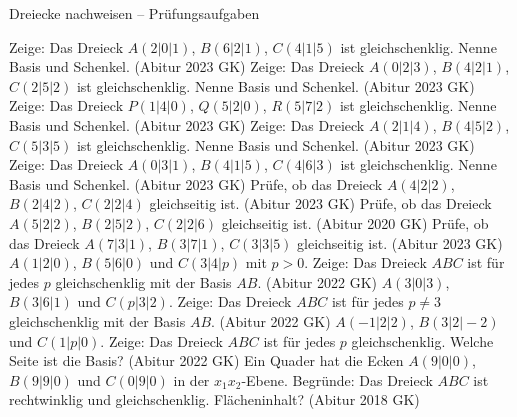 \begin{aufgabe}{Dreiecke nachweisen – Prüfungsaufgaben}
\begin{teile}
\teil Zeige: Das Dreieck $A(2 | 0 | 1)$, $B(6 | 2 | 1)$, $C(4 | 1 | 5)$ ist gleichschenklig. Nenne Basis und Schenkel. \hfill (Abitur 2023 GK)
\teil Zeige: Das Dreieck $A(0 | 2 | 3)$, $B(4 | 2 | 1)$, $C(2 | 5 | 2)$ ist gleichschenklig. Nenne Basis und Schenkel. \hfill (Abitur 2023 GK)
\teil Zeige: Das Dreieck $P(1 | 4 | 0)$, $Q(5 | 2 | 0)$, $R(5 | 7 | 2)$ ist gleichschenklig. Nenne Basis und Schenkel. \hfill (Abitur 2023 GK)
\teil Zeige: Das Dreieck $A(2 | 1 | 4)$, $B(4 | 5 | 2)$, $C(5 | 3 | 5)$ ist gleichschenklig. Nenne Basis und Schenkel. \hfill (Abitur 2023 GK)
\teil Zeige: Das Dreieck $A(0 | 3 | 1)$, $B(4 | 1 | 5)$, $C(4 | 6 | 3)$ ist gleichschenklig. Nenne Basis und Schenkel. \hfill (Abitur 2023 GK)
\teil Prüfe, ob das Dreieck $A(4 | 2 | 2)$, $B(2 | 4 | 2)$, $C(2 | 2 | 4)$ gleichseitig ist. \hfill (Abitur 2023 GK)
\teil Prüfe, ob das Dreieck $A(5 | 2 | 2)$, $B(2 | 5 | 2)$, $C(2 | 2 | 6)$ gleichseitig ist. \hfill (Abitur 2020 GK)
\teil Prüfe, ob das Dreieck $A(7 | 3 | 1)$, $B(3 | 7 | 1)$, $C(3 | 3 | 5)$ gleichseitig ist. \hfill (Abitur 2023 GK)
\teil $A(1 | 2 | 0)$, $B(5 | 6 | 0)$ und $C(3 | 4 | p)$ mit $p > 0$. Zeige: Das Dreieck $ABC$ ist für jedes $p$ gleichschenklig mit der Basis $AB$. \hfill (Abitur 2022 GK)
\teil $A(3 | 0 | 3)$, $B(3 | 6 | 1)$ und $C(p | 3 | 2)$. Zeige: Das Dreieck $ABC$ ist für jedes $p \ne 3$ gleichschenklig mit der Basis $AB$. \hfill (Abitur 2022 GK)
\teil $A(-1 | 2 | 2)$, $B(3 | 2 | -2)$ und $C(1 | p | 0)$. Zeige: Das Dreieck $ABC$ ist für jedes $p$ gleichschenklig. Welche Seite ist die Basis? \hfill (Abitur 2022 GK)
\teil Ein Quader hat die Ecken $A(9 | 0 | 0)$, $B(9 | 9 | 0)$ und $C(0 | 9 | 0)$ in der $x_1x_2$-Ebene. Begründe: Das Dreieck $ABC$ ist rechtwinklig und gleichschenklig. Flächeninhalt? \hfill (Abitur 2018 GK)
\end{teile}
\end{aufgabe}

